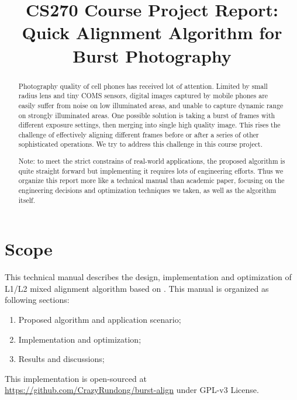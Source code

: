 \documentclass[conference, 10pt]{IEEEtran}
\begin{document}
\title{CS270 Course Project Report:\\
Quick Alignment Algorithm for Burst Photography}

\author{
}

\maketitle

\begin{abstract}
    Photography quality of cell phones has received lot of attention. 
    Limited by small radius lens and tiny COMS sensors, digital images captured by
    mobile phones are easily suffer from noise on low illuminated areas, and unable to capture
    dynamic range on strongly illuminated areas. One possible solution is taking a burst of frames with different
    exposure settings, then merging into single high quality image.
    This rises the challenge of effectively aligning different frames before or after a series
    of other sophisticated operations. 
    We try to address this challenge in this course project.

    Note: to meet the strict constrains of real-world applications, the proposed algorithm
    is quite straight forward but implementing it requires lots of engineering efforts.
    Thus we organize this report more like a technical manual than academic paper, 
    focusing on the engineering decisions and optimization techniques we taken, as well as the algorithm itself.
\end{abstract}

\section{Scope}

This technical manual describes the design, implementation and optimization of L1/L2 mixed
alignment algorithm based on \cite{hasinoff2016burst}. This manual is organized as following sections:
\begin{enumerate}
    \item Proposed algorithm and application scenario;
    \item Implementation and optimization;
    \item Results and discussions;
\end{enumerate}

This implementation is open-sourced at \url{https://github.com/CrazyRundong/burst-align} under GPL-v3 License.
\end{document}
